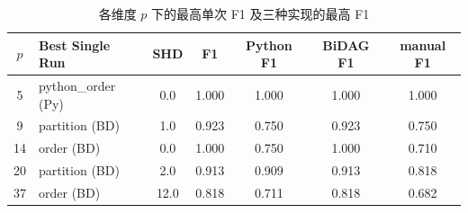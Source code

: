\begin{table}[htbp]
\centering
\caption{各维度 $p$ 下的最高单次 F1 及三种实现的最高 F1}
\label{tab:impl_compare}
\begin{tabular}{c l c c c c c}
\toprule
$p$ & Best Single Run & SHD & F1 & Python F1 & BiDAG F1 & manual F1 \\
\midrule
5 & python\_order (Py) & 0.0 & 1.000 & 1.000 & 1.000 & 1.000 \\
9 & partition (BD) & 1.0 & 0.923 & 0.750 & 0.923 & 0.750 \\
14 & order (BD) & 0.0 & 1.000 & 0.750 & 1.000 & 0.710 \\
20 & partition (BD) & 2.0 & 0.913 & 0.909 & 0.913 & 0.818 \\
37 & order (BD) & 12.0 & 0.818 & 0.711 & 0.818 & 0.682 \\
\bottomrule
\end{tabular}
\end{table}
